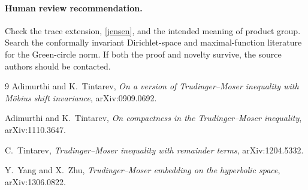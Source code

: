 \documentclass[11pt]{article}
\begin{document}
\paragraph{Human review recommendation.}
Check the trace extension, \eqref{jensen}, and the intended meaning of
product group.  Search the conformally invariant Dirichlet-space and
maximal-function literature for the Green-circle norm.  If both the
proof and novelty survive, the source authors should be contacted.

\begin{thebibliography}{9}
Adimurthi and K.~Tintarev,
\emph{On a version of Trudinger--Moser inequality with M\"obius shift
invariance}, arXiv:0909.0692.

Adimurthi and K.~Tintarev,
\emph{On compactness in the Trudinger--Moser inequality},
arXiv:1110.3647.

C.~Tintarev,
\emph{Trudinger--Moser inequality with remainder terms},
arXiv:1204.5332.

Y.~Yang and X.~Zhu,
\emph{Trudinger--Moser embedding on the hyperbolic space},
arXiv:1306.0822.
\end{thebibliography}
\end{document}
